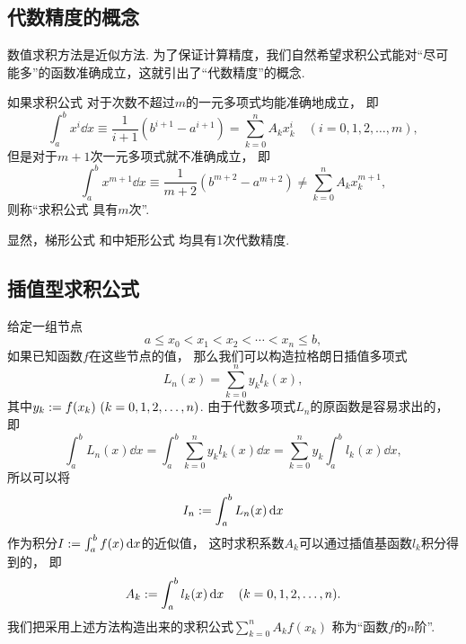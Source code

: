 \subsection{代数精度的概念}
数值求积方法是近似方法.
为了保证计算精度，我们自然希望求积公式能对“尽可能多”的函数准确成立，这就引出了“代数精度”的概念.
\begin{definition}
如果求积公式 
对于次数不超过\(m\)的一元多项式均能准确地成立，
即\begin{equation*}
	\int_a^b x^i \dd{x}
	\equiv \frac{1}{i+1} (b^{i+1} - a^{i+1})
	= \sum_{k=0}^n A_k x_k^i
	\quad(i=0,1,2,\dotsc,m),
\end{equation*}
但是对于\(m+1\)次一元多项式就不准确成立，
即\begin{equation*}
	\int_a^b x^{m+1} \dd{x}
	\equiv \frac{1}{m+2} (b^{m+2} - a^{m+2})
	\neq \sum_{k=0}^n A_k x_k^{m+1},
\end{equation*}
则称“求积公式 
具有\(m\)次”.
\end{definition}

显然，梯形公式 
和中矩形公式 
均具有1次代数精度.

\subsection{插值型求积公式}
给定一组节点\begin{equation*}
	a \leq x_0 < x_1 < x_2 < \dotsb < x_n \leq b,
\end{equation*}
如果已知函数\(f\)在这些节点的值，
那么我们可以构造拉格朗日插值多项式\begin{equation*}
	L_n(x)
	= \sum_{k=0}^n y_k l_k(x),
\end{equation*}
其中\(y_k := f(x_k)\ (k=0,1,2,\dotsc,n)\).
由于代数多项式\(L_n\)的原函数是容易求出的，
即\begin{equation*}
	\int_a^b L_n(x) \dd{x}
	= \int_a^b \sum_{k=0}^n y_k l_k(x) \dd{x}
	= \sum_{k=0}^n y_k \int_a^b l_k(x) \dd{x},
\end{equation*}
所以可以将\begin{equation*}
	I_n := \int_a^b L_n(x) \dd{x}
\end{equation*}
作为积分\(I := \int_a^b f(x) \dd{x}\)的近似值，
这时求积系数\(A_k\)可以通过插值基函数\(l_k\)积分得到的，
即\begin{equation}\label{equation:数值积分.插值型求积公式的求积系数}
	A_k := \int_a^b l_k(x) \dd{x}
	\quad(k=0,1,2,\dotsc,n).
\end{equation}
我们把采用上述方法构造出来的求积公式\(
	\sum_{k=0}^n A_k f(x_k)
\)
称为“函数\(f\)的\(n\)阶”.

